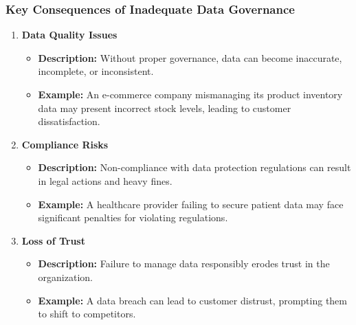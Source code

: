 \documentclass[aspectratio=169]{beamer}
\begin{document}
\begin{frame}[fragile]
    \frametitle{Key Consequences of Inadequate Data Governance}
    \begin{enumerate}
        \item \textbf{Data Quality Issues}
            \begin{itemize}
                \item \textbf{Description:} Without proper governance, data can become inaccurate, incomplete, or inconsistent.
                \item \textbf{Example:} An e-commerce company mismanaging its product inventory data may present incorrect stock levels, leading to customer dissatisfaction.
            \end{itemize}

        \item \textbf{Compliance Risks}
            \begin{itemize}
                \item \textbf{Description:} Non-compliance with data protection regulations can result in legal actions and heavy fines.
                \item \textbf{Example:} A healthcare provider failing to secure patient data may face significant penalties for violating regulations.
            \end{itemize}

        \item \textbf{Loss of Trust}
            \begin{itemize}
                \item \textbf{Description:} Failure to manage data responsibly erodes trust in the organization.
                \item \textbf{Example:} A data breach can lead to customer distrust, prompting them to shift to competitors.
            \end{itemize}
    \end{enumerate}
\end{frame}
\end{document}
